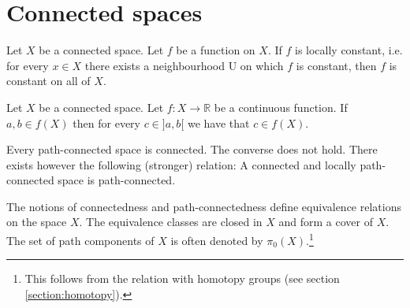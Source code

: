 \section{Connected spaces}


    \begin{property}
        Let $X$ be a connected space. Let $f$ be a function on $X$. If $f$ is locally constant, i.e. for every $x\in X$ there exists a neighbourhood U on which $f$ is constant, then $f$ is constant on all of $X$.
    \end{property}

    \begin{theorem}\label{topology:theorem:intermediate_value_theorem}
        Let $X$ be a connected space. Let $f:X\rightarrow\mathbb{R}$ be a continuous function. If $a, b\in f(X)$ then for every $c\in ]a, b[$ we have that $c\in f(X)$.
    \end{theorem}


    \begin{property}
        Every path-connected space is connected. The converse does not hold. There exists however the following (stronger) relation: A connected and locally path-connected space is path-connected.
    \end{property}

    \begin{remark}
        The notions of connectedness and path-connectedness define equivalence relations on the space $X$. The equivalence classes are closed in $X$ and form a cover of $X$. The set of path components of $X$ is often denoted by $\pi_0(X)$.\footnote{This follows from the relation with homotopy groups (see section \ref{section:homotopy}).}
    \end{remark}

